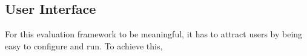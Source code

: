 \subsection{User Interface}

For this evaluation framework to be meaningful, it has to attract users by being easy to configure and run.
To achieve this, 

